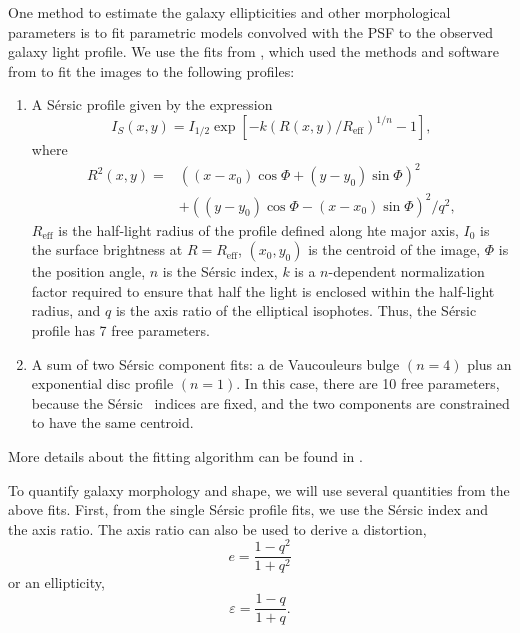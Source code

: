 \documentclass[twocolumn,useAMS,usenatbib]{mn2e}
\newcommand{\sersic}{S\'{e}rsic }
\begin{document}
One method to estimate the galaxy ellipticities and other
morphological parameters is to fit parametric models convolved with
the PSF to the observed galaxy light profile.  We use the fits from
\cite{great3}, which used the methods and
software from \cite{Claire_Fits} to fit the images to the following profiles:
\begin{enumerate}
 \item A \sersic profile given by the expression 
       \begin{equation} 
    I_S(x,y) = I_{1/2}\exp{\left[ -k(R(x,y)/R_{\text{eff}})^{1/n} -1 \right]},
       \end{equation}
where \begin{align*} R^2(x,y) = & ((x-x_0)\cos\Phi+(y-y_0)\sin\Phi)^2
  \\ & + ((y-y_0)\cos\Phi-(x-x_0)\sin\Phi)^2/q^2, \end{align*}
$R_{\text{eff}}$ is the half-light radius of the profile defined along
hte major axis, $I_0$ is the surface brightness at $R=R_{\text{eff}}$, $(x_0,y_0)$ is the centroid of the image,
$\Phi$ is the position angle, $n$ is the \sersic index, $k$ is a
$n$-dependent normalization factor required to ensure that half the
light is enclosed within the half-light radius, and $q$ is the axis
ratio of the elliptical isophotes.
Thus, the \sersic profile has 7 free parameters.
       \item A sum of two \sersic component fits: a de Vaucouleurs
         bulge $(n=4)$ plus an exponential disc profile $(n=1)$.  In this
         case, there are 10 free parameters, because the \sersic\
         indices are fixed, and the two components are constrained to
         have the same centroid.
\end{enumerate}
More details about the fitting algorithm can be found
in \cite{Claire_Fits}.

To quantify galaxy morphology and shape, we will use several
quantities from the above fits.  First, from the single \sersic
profile fits, we use the \sersic index and the axis ratio.  The axis
ratio can also be used to derive a distortion,
\begin{equation}\label{eq:distortion}
e = \frac{1-q^2}{1+q^2}
\end{equation}
or an ellipticity,
\begin{equation}\label{eq:ellipticity}
\varepsilon = \frac{1-q}{1+q}.
\end{equation}
\end{document}

